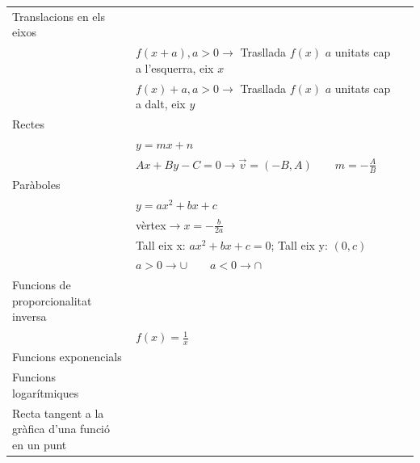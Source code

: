 \documentclass{article}
\begin{document}
\begin{center}
\begin{longtable}{ | l |l|l|}
    Translacions en els eixos& & \\
    & $f(x+a), a>0\rightarrow$ Trasllada $f(x)$ $a$ unitats cap a l'esquerra, eix $x$& \\
    & $f(x)+a, a>0\rightarrow$ Trasllada $f(x)$ $a$ unitats cap a dalt, eix $y$& \\
    \hline
    Rectes& & \\
    &$y=mx+n$&\\
    &$Ax+By-C=0\rightarrow \overrightarrow{v}=(-B,A)\qquad m=-\frac{A}{B}$&\\
    \hline
    Paràboles& & \\
    &$y=ax^2+bx+c$&\\
    &vèrtex$\rightarrow x=-\frac{b}{2a}$&\\
    &Tall eix x: $ax^2+bx+c=0$; Tall eix y: $(0,c)$&\\
    &$a>0\rightarrow \cup \qquad a<0\rightarrow \cap$&\\
     \hline
    Funcions de proporcionalitat inversa& & \\
    &$f(x)=\frac{1}{x}$&\\
    \hline
    Funcions exponencials& & \\
    \hline
    Funcions logarítmiques& & \\
        \hline
    Recta tangent a la gràfica d'una funció en un punt& & \\
\hline
	\end{longtable}
\end{center}
\end{document}
